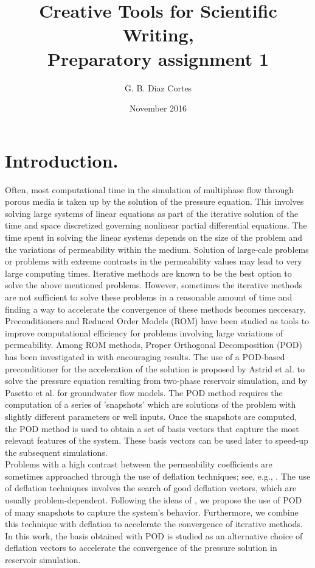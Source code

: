 \documentclass[12pt]{article}
\title{Creative Tools for Scientific Writing, \\Preparatory assignment 1}
\author{G. B. Diaz Cortes}
\date{November 2016}
\numberwithin{equation}{section}
\begin{document}

\maketitle


  \section{Introduction.}
  \hspace{0.5cm}Often, most computational time in the simulation of multiphase flow through porous media is taken 
  up by the
solution of the pressure equation. This involves solving large systems of linear equations as 
part of the iterative solution of the time and space discretized governing nonlinear partial differential 
equations. The time spent in solving the linear systems depends on the size of the problem and the 
variations of permeability within the medium. Solution of large-cale problems or problems with extreme contrasts in the
permeability values may lead to very large computing times. 
Iterative methods are known to be the best option to solve the above mentioned problems. However, sometimes the iterative methods are not 
sufficient to solve these problems in a reasonable amount of time and finding a way to accelerate the convergence of these methods becomes neccesary. \\
Preconditioners and Reduced Order Models (ROM) have been studied as tools to improve computational efficiency \cite{Barone09,Kala14} for problems involving large variations of permeability. Among ROM methods,
Proper Orthogonal Decomposition (POD) has been investigated in \cite{Mark06,Pasetto16,Carlberg15} with encouraging results. 
The use of a POD-based preconditioner for the acceleration of the solution is proposed by Astrid et al.
\cite{Astrid11} to solve the pressure equation resulting from two-phase reservoir simulation, and by Pasetto 
et al. \cite{Pasetto16} for groundwater flow models. 
The POD method requires the computation of a series of 'snapshots' which are solutions of the problem with slightly 
different parameters or well inputs. 
Once the snapshots are computed, the POD method is used to obtain a set of basis 
vectors that capture the most relevant features of the system. These basis vectors can be used later to speed-up the subsequent simulations.\\
Problems with a high contrast between the permeability coefficients are sometimes approached through the 
use of deflation techniques; see, e.g., \cite{Vuik99}. The use of deflation techniques involves the search 
of good deflation vectors, which are usually problem-dependent. 
Following the ideas of \cite{Astrid11,Mark06,Pasetto16,Carlberg15}, we propose the use of POD of many snapshots 
to capture the system's behavior. Furthermore, we combine this technique with deflation to accelerate the convergence of iterative methods. \\
In this work, the basis obtained with POD is 
studied as an alternative choice of deflation vectors 
to accelerate the convergence of the pressure solution in reservoir simulation.  \\
\end{document}

